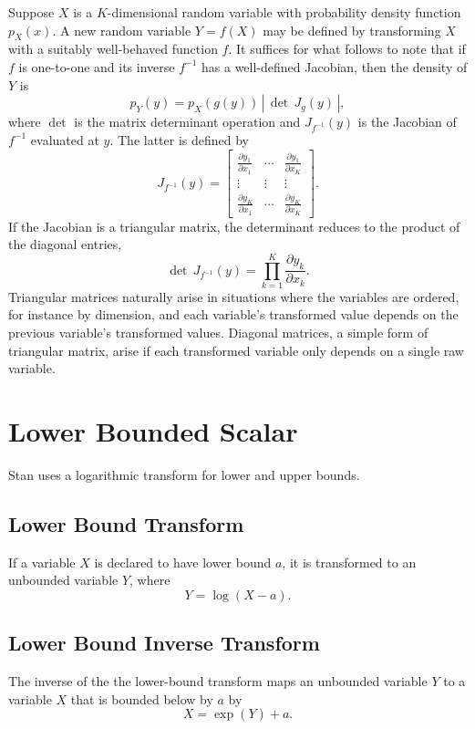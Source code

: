 \documentclass[10pt]{report}
\newcommand{\Stan}{Stan\xspace}
\begin{document}
Suppose $X$ is a $K$-dimensional random variable with probability
density function $p_X(x)$.  A new random variable $Y = f(X)$ may be
defined by transforming $X$ with a suitably well-behaved function $f$.
It suffices for what follows to note that if $f$ is one-to-one
and its inverse $f^{-1}$ has a well-defined Jacobian, then the
density of $Y$ is
%
\[
p_Y(y) = p_X(g(y)) \, \left| \, \det \, J_g(y) \, \right|,
\]
%
where $\det{}$ is the matrix determinant operation and $J_{f^{-1}}(y)$ is
the Jacobian of $f^{-1}$ evaluated at $y$.  The latter is defined by
\[
J_{f^{-1}}(y) = 
\left[
\begin{array}{ccc}\displaystyle
\frac{\partial y_1}{\partial x_1}
& \cdots
& \displaystyle \frac{\partial y_1}{\partial x_{K}}
\\[6pt]
\vdots & \vdots & \vdots
\\
\displaystyle\frac{\partial y_{K}}{\partial x_1}
& \cdots
& \displaystyle\frac{\partial y_{K}}{\partial x_{K}}
\end{array}
\right].
\]
%
If the Jacobian is a triangular matrix, the determinant reduces to the
product of the diagonal entries,
%
\[
\det \, J_{f^{-1}}(y)
= \prod_{k=1}^K \frac{\partial y_k}{\partial x_k}.
\]
%
Triangular matrices naturally arise in situations where the variables
are ordered, for instance by dimension, and each variable's
transformed value depends on the previous variable's transformed
values.  Diagonal matrices, a simple form of triangular matrix,
arise if each transformed variable only depends on a single raw
variable.

\section{Lower Bounded Scalar}

\Stan uses a logarithmic transform for lower and upper bounds.  

\subsection{Lower Bound Transform}

If a variable $X$ is declared to have lower bound $a$, it is
transformed to an unbounded variable $Y$, where
%
\[
Y = \log(X - a).
\]

\subsection{Lower Bound Inverse Transform}
%
The inverse of the the lower-bound transform maps an unbounded
variable $Y$ to a variable $X$ that is bounded below by $a$ by
%
\[
X = \exp(Y) + a.
\]
\end{document}
